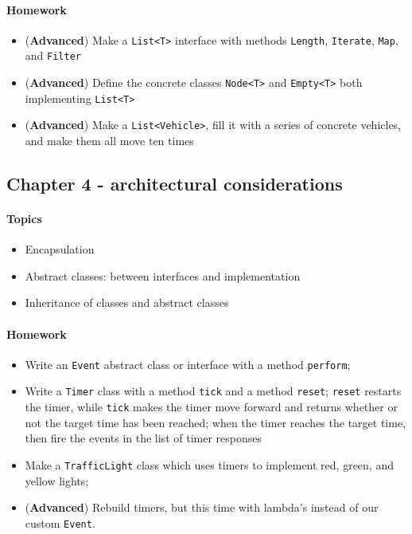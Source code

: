 		\paragraph*{Homework}
		\begin{itemize}
			\item (\textbf{Advanced}) Make a \texttt{List<T>} interface with methods \texttt{Length}, \texttt{Iterate}, \texttt{Map}, and \texttt{Filter}
			\item (\textbf{Advanced}) Define the concrete classes \texttt{Node<T>} and \texttt{Empty<T>} both implementing \texttt{List<T>}
			\item (\textbf{Advanced}) Make a \texttt{List<Vehicle>}, fill it with a series of concrete vehicles, and make them all move ten times
		\end{itemize}
		
		
		
		\subsection{Chapter 4 - architectural considerations}
		
		\paragraph*{Topics}			
		\begin{itemize}
			\item Encapsulation
			\item Abstract classes: between interfaces and implementation
			\item Inheritance of classes and abstract classes
		\end{itemize}
		
		\paragraph*{Homework}
		\begin{itemize}
			\item Write an \texttt{Event} abstract class or interface with a method \texttt{perform}; 
			\item Write a \texttt{Timer} class with a method \texttt{tick} and a method \texttt{reset}; \texttt{reset} restarts the timer, while \texttt{tick} makes the timer move forward and returns whether or not the target time has been reached; when the timer reaches the target time, then fire the events in the list of timer responses
			\item Make a \texttt{TrafficLight} class which uses timers to implement red, green, and yellow lights;
			\item (\textbf{Advanced}) Rebuild timers, but this time with lambda's instead of our custom \texttt{Event}.
		\end{itemize}
		
